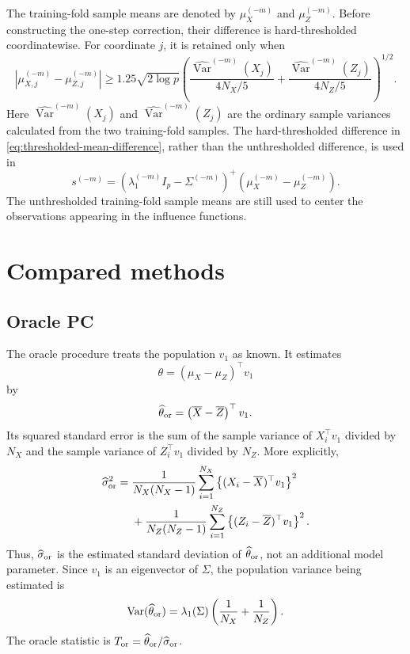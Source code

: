 \documentclass[11pt]{article}
\begin{document}
The training-fold sample means are denoted by $\mu_X^{(-m)}$ and
$\mu_Z^{(-m)}$. Before constructing the one-step correction, their difference
is hard-thresholded coordinatewise. For coordinate $j$, it is retained only
when
\begin{equation}
\left|\mu_{X,j}^{(-m)}-\mu_{Z,j}^{(-m)}\right|
\geq
1.25\sqrt{2\log p}
\left(
\frac{\widehat{\operatorname{Var}}^{(-m)}(X_j)}
{4N_X/5}
+
\frac{\widehat{\operatorname{Var}}^{(-m)}(Z_j)}
{4N_Z/5}
\right)^{1/2}.
\label{eq:thresholded-mean-difference}
\end{equation}
Here $\widehat{\operatorname{Var}}^{(-m)}(X_j)$ and
$\widehat{\operatorname{Var}}^{(-m)}(Z_j)$ are the ordinary sample variances
calculated from the two training-fold samples.
The hard-thresholded difference in
\eqref{eq:thresholded-mean-difference}, rather than the unthresholded
difference, is used in
\begin{equation}
s^{(-m)}
=
\left(\lambda_1^{(-m)}I_p-\Sigma^{(-m)}\right)^+
\left(\mu_X^{(-m)}-\mu_Z^{(-m)}\right).
\label{eq:estimated-s}
\end{equation}
The unthresholded training-fold sample means are still used to center the
observations appearing in the influence functions.


\section{Compared methods}

\subsection{Oracle PC}

The oracle procedure treats the population $v_1$ as known. It estimates
\[
\theta=\left(\mu_X-\mu_Z\right)^\top v_1
\]
by
\[
\widehat\theta_{\rm or}
=
\left(\overline X-\overline Z\right)^\top v_1.
\]
Its squared standard error is the sum of the sample variance of $X_i^\top v_1$
divided by $N_X$ and the sample variance of $Z_i^\top v_1$ divided by $N_Z$.
More explicitly,
\begin{align}
\widehat\sigma_{\rm or}^2
={}&
\frac{1}{N_X(N_X-1)}
\sum_{i=1}^{N_X}
\left\{(X_i-\overline X)^\top v_1\right\}^2
\nonumber\\
&+
\frac{1}{N_Z(N_Z-1)}
\sum_{i=1}^{N_Z}
\left\{(Z_i-\overline Z)^\top v_1\right\}^2.
\label{eq:oracle-standard-error}
\end{align}
Thus, $\widehat\sigma_{\rm or}$ is the estimated standard deviation of
$\widehat\theta_{\rm or}$, not an additional model parameter. Since $v_1$ is
an eigenvector of $\Sigma$, the population variance being estimated is
\[
\operatorname{Var}(\widehat\theta_{\rm or})
=
\lambda_1(\Sigma)\left(\frac{1}{N_X}+\frac{1}{N_Z}\right).
\]
The oracle statistic is
$T_{\rm or}=\widehat\theta_{\rm or}/\widehat\sigma_{\rm or}$.
\end{document}
